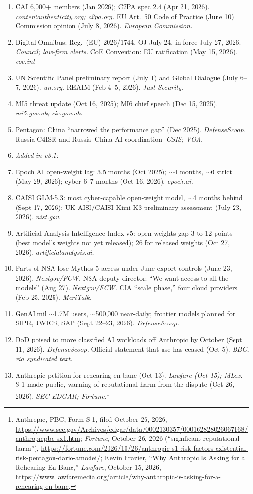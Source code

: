 \documentclass[11pt,letterpaper]{article}
\makeatletter
\newcommand{\etraneed}[1]{\par\if@nobreak\else\penalty\z@\ifdim\pagegoal<\maxdimen\ifdim\dimexpr\pagegoal-\pagetotal\relax<\dimexpr#1\relax\newpage\fi\fi\fi}
\makeatother
\begin{document}
{\begin{enumerate}[itemsep=1pt]
  \item CAI 6,000+ members (Jan 2026); C2PA spec 2.4 (Apr 21, 2026). \textit{contentauthenticity.org; c2pa.org.} EU Art.\ 50 Code of Practice (June 10); Commission opinion (July 8, 2026). \textit{European Commission.}
  \item Digital Omnibus: Reg.\ (EU) 2026/1744, OJ July 24, in force July 27, 2026. \textit{Council; law-firm alerts.} CoE Convention: EU ratification (May 15, 2026). \textit{coe.int.}
  \item UN Scientific Panel preliminary report (July 1) and Global Dialogue (July 6--7, 2026). \textit{un.org.} REAIM (Feb 4--5, 2026). \textit{Just Security.}
  \item MI5 threat update (Oct 16, 2025); MI6 chief speech (Dec 15, 2025). \textit{mi5.gov.uk; sis.gov.uk.}
  \item Pentagon: China ``narrowed the performance gap'' (Dec 2025). \textit{DefenseScoop.} Russia C4ISR and Russia--China AI coordination. \textit{CSIS; VOA.}
  \etraneed{5\baselineskip}\item[] \textit{Added in v3.1:}
  \item Epoch AI open-weight lag: 3.5 months (Oct 2025); $\sim$4 months, $\sim$6 strict (May 29, 2026); cyber 6--7 months (Oct 16, 2026). \textit{epoch.ai.}
  \item CAISI GLM-5.3: most cyber-capable open-weight model, $\sim$4 months behind (Sept 17, 2026); UK AISI/CAISI Kimi K3 preliminary assessment (July 23, 2026). \textit{nist.gov.}
  \item Artificial Analysis Intelligence Index v5: open-weights gap 3 to 12 points (best model's weights not yet released); 26 for released weights (Oct 27, 2026). \textit{artificialanalysis.ai.}
  \item Parts of NSA lose Mythos 5 access under June export controls (June 23, 2026). \textit{Nextgov/FCW.} NSA deputy director: ``We want access to all the models'' (Aug 27). \textit{Nextgov/FCW.} CIA ``scale phase,'' four cloud providers (Feb 25, 2026). \textit{MeriTalk.}
  \item GenAI.mil $\sim$1.7M users, $\sim$500,000 near-daily; frontier models planned for SIPR, JWICS, SAP (Sept 22--23, 2026). \textit{DefenseScoop.}
  \item DoD poised to move classified AI workloads off Anthropic by October (Sept 11, 2026). \textit{DefenseScoop.} Official statement that use has ceased (Oct 5). \textit{BBC, via syndicated text.}
  \item Anthropic petition for rehearing en banc (Oct 13). \textit{Lawfare (Oct 15); MLex.} S-1 made public, warning of reputational harm from the dispute (Oct 26, 2026). \textit{SEC EDGAR; Fortune.}\footnote{Anthropic, PBC, Form S-1, filed October 26, 2026, \url{https://www.sec.gov/Archives/edgar/data/0002130357/000162828026067168/anthropicpbc-sx1.htm}; \textit{Fortune}, October 26, 2026 (``significant reputational harm''), \url{https://fortune.com/2026/10/26/anthropic-s1-risk-factors-existential-risk-pentagon-dario-amodei/}; Kevin Frazier, ``Why Anthropic Is Asking for a Rehearing En Banc,'' \textit{Lawfare}, October 15, 2026, \url{https://www.lawfaremedia.org/article/why-anthropic-is-asking-for-a-rehearing-en-banc}.}

\end{enumerate}}
\end{document}
